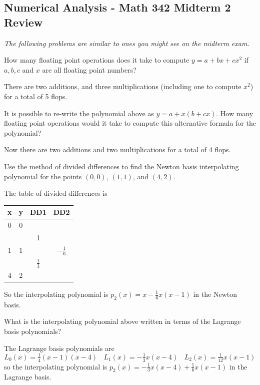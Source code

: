 \documentclass[11pt, answers]{exam}
\begin{document}
\graphicspath{{/home/brian/Dropbox/HSC/Spring16/Math111/}}

\subsection*{Numerical Analysis - Math 342 \hfill Midterm 2 Review}

\textit{The following problems are similar to ones you might see on the midterm exam.}

\begin{questions}

\question How many floating point operations does it take to compute $y = a + bx + cx^2$ if $a, b, c$ and $x$ are all floating point numbers? 
\begin{solution}
There are two additions, and three multiplications (including one to compute $x^2$) for a total of 5 flops. 
\end{solution}
\vfill

\question It is possible to re-write the polynomial above as $y = a + x(b + cx)$.  How many floating point operations would it take to compute this alternative formula for the polynomial? 
\begin{solution}
Now there are two additions and two multiplications for a total of 4 flops. 
\end{solution}
\vfill



\question Use the method of divided differences to find the Newton basis interpolating polynomial for the points $(0,0)$, $(1,1)$, and $(4,2)$.   

\begin{solution}
The table of divided differences is 

\begin{tabular}{c|ccc}
x & y & DD1 & DD2 \\ \hline
0 & 0 & ~  & ~ \\
~ & ~ & 1  & ~ \\
1 & 1 & ~  & $-\tfrac{1}{6}$ \\
~ & ~ & $\tfrac{1}{3}$  & ~ \\
4 & 2 & ~  & ~ \\
\end{tabular}

\noindent
So the interpolating polynomial is $p_2(x) = x - \tfrac{1}{6}x(x-1)$ in the Newton basis.
\end{solution}
\vfill

\question What is the interpolating polynomial above written in terms of the Lagrange basis polynomials? 
\begin{solution}
The Lagrange basis polynomials are
$$L_0(x) = \tfrac{1}{4}(x-1)(x-4) ~~~~ L_1(x) = -\tfrac{1}{3} x(x-4) ~~~~ L_2(x) = \tfrac{1}{12} x(x-1)$$
so the interpolating polynomial is $p_2(x) = -\tfrac{1}{3} x(x-4) + \tfrac{1}{6}x(x-1)$ in the Lagrange basis.
\end{solution}
\vfill


\end{questions}
\end{document}
